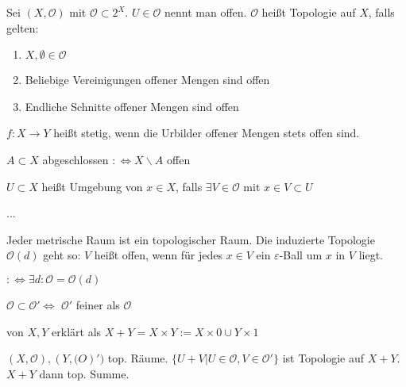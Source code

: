 \begin{defi}[Topologie]
  Sei $(X,\mathcal{O})$ mit $\mathcal{O} \subset 2^X$.
  $U \in \mathcal{O}$ nennt man offen.
  $\mathcal{O}$ heißt Topologie auf $X$, falls gelten:
  \begin{enumerate}
    \item $X, \emptyset \in \mathcal{O}$
    \item Beliebige Vereinigungen offener Mengen sind offen
    \item Endliche Schnitte offener Mengen sind offen
  \end{enumerate}
\end{defi}

\begin{defi}[Stetigkeit]
  $f:X\rightarrow Y$ heißt stetig, wenn die Urbilder offener Mengen stets offen sind.
\end{defi}

\begin{defi}[Abgeschlossen]
  $A \subset X$ abgeschlossen $:\Leftrightarrow X\backslash A$ offen
\end{defi}
\begin{defi}[Umgebung]
  $U \subset X$ heißt Umgebung von $x\in X$, falls
  $\exists V\in \mathcal{O}$ mit $x\in V \subset U$
\end{defi}
\begin{defi}
  ...
\end{defi}

\begin{defi}
  Jeder metrische Raum ist ein topologischer Raum.
  Die induzierte Topologie $\mathcal{O}(d)$ geht so: $V$ heißt offen,
  wenn für jedes $x\in V$ ein $\varepsilon$-Ball um $x$ in $V$ liegt.
\end{defi}
\begin{defi}
  $:\Leftrightarrow \exists d: \mathcal{O} = \mathcal{O}(d)$
\end{defi}

\begin{defi}
  $\mathcal{O} \subset \mathcal{O}' \Leftrightarrow$
  $\mathcal{O}'$ feiner als $\mathcal{O}$
\end{defi}

\begin{defi}
  von $X, Y$ erklärt als
  $X+Y = X\times Y:= X\times {0} \cup Y\times {1}$
\end{defi}

\begin{defi}
  $(X,\mathcal{O}), (Y,\mathcal(O)')$ top. Räume.
  $\{U+V | U \in \mathcal{O}, V \in \mathcal{O}'\}$
  ist Topologie auf $X+Y$. $X+Y$ dann top. Summe.
\end{defi}

